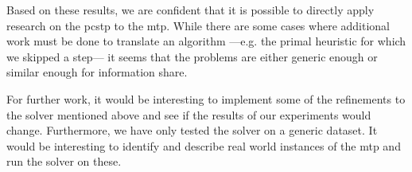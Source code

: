 Based on these results, we are confident that it is possible to directly apply research on
the \gls{pcstp} to the \gls{mtp}. While there are some cases where additional work must be
done to translate an algorithm ---e.g. the primal heuristic for which we skipped a step---
it seems that the problems are either generic enough or similar enough for information share.

For further work, it would be interesting to implement some of the refinements to the solver
mentioned above and see if the results of our experiments would change. Furthermore, we have
only tested the solver on a generic dataset. It would be interesting to identify and describe
real world instances of the \gls{mtp} and run the solver on these.


